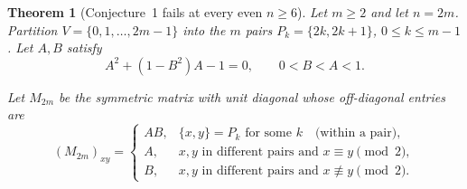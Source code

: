 \documentclass[11pt]{article}
\theoremstyle{plain}
\newtheorem{theorem}{Theorem}[section]
\theoremstyle{definition}
\theoremstyle{remark}
\begin{document}
\begin{aiblock}



\begin{theorem}[Conjecture~1 fails at every even $n\ge6$]\label{thm:M2m}
Let $m\ge2$ and let $n=2m$. Partition $V=\{0,1,\dots,2m-1\}$ into the $m$ \emph{pairs}
$P_k=\{2k,2k+1\}$, $0\le k\le m-1$. Let $A, B$ satisfy
\begin{equation}\label{eq:curve}
A^2+(1-B^2)A-1=0,\qquad 0<B<A<1 .
\end{equation}

Let $M_{2m}$ be the symmetric matrix with unit diagonal whose off-diagonal entries are \[ (M_{2m})_{xy}= \begin{cases} AB, & \{x,y\}=P_k \text{ for some } k \quad\text{(within a pair)},\\ A, & x,y \text{ in different pairs and } x\equiv y \pmod 2,\\ B, & x,y \text{ in different pairs and } x\not\equiv y \pmod 2 . \end{cases} \]


\end{theorem}
\end{aiblock}
\end{document}

